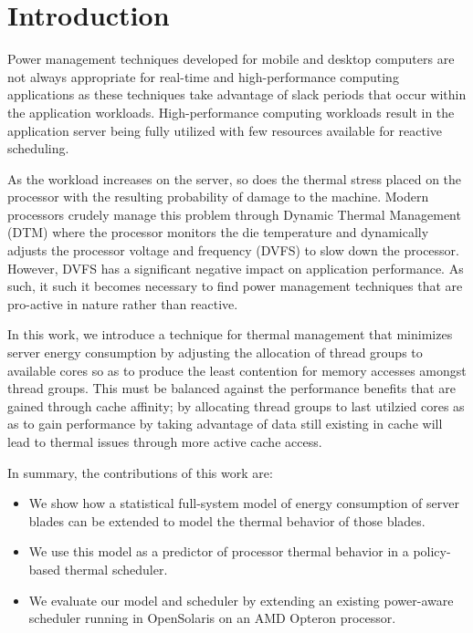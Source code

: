 \documentclass[times,10pt,onecolumn]{article}
\begin{document}

\section{Introduction}
\label{sec:Introduction}
Power management techniques developed for mobile and desktop computers
are not always appropriate for real-time and high-performance computing
applications as these techniques take advantage of slack periods that
occur within the application workloads. High-performance computing
workloads result in the application server being fully utilized with few
resources available for reactive scheduling.

As the workload increases on the server, so does the thermal stress
placed on the processor with the resulting probability of damage to the
machine.  Modern processors crudely manage this problem through Dynamic
Thermal Management (DTM) where the processor monitors the die
temperature and dynamically adjusts the processor voltage and frequency
(DVFS) to slow down the processor.  However, DVFS has a significant
negative impact on application performance.  As such, it such it becomes
necessary to find power management techniques that are pro-active in
nature rather than reactive.

In this work, we introduce a technique for thermal management that
minimizes server energy consumption by adjusting the allocation of
thread groups to available cores so as to produce the least contention
for memory accesses amongst thread groups.  This must be balanced
against the performance benefits that are gained through cache affinity;
by allocating thread groups to last utilzied cores as as to gain
performance by taking advantage of data still existing in cache will
lead to thermal issues through more active cache access.

In summary, the contributions of this work are:
\begin{itemize}
\item We show how a statistical full-system model of energy
  consumption of server blades can be extended to model the thermal
  behavior of those blades.
\item We use this model as a predictor of processor
  thermal behavior in a policy-based thermal scheduler.
\item We evaluate our model and scheduler by extending an existing
  power-aware scheduler running in OpenSolaris on an AMD Opteron
  processor.
\end{itemize}
\end{document}
